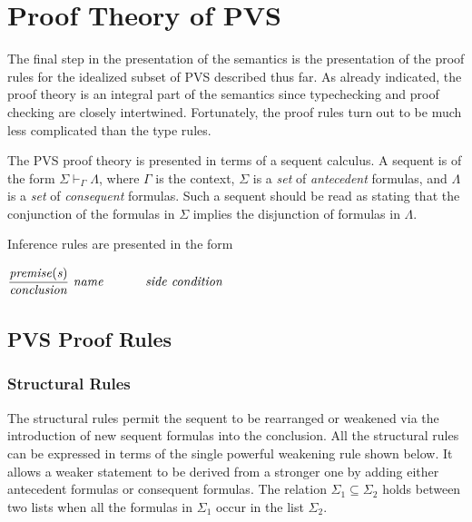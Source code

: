 \documentclass [12pt,twoside]{cslreport}
\newcommand{\Infrule}[3]{
{{\displaystyle\strut #1}\over{\displaystyle\strut #2}}\qquad\makebox[0pt][l]{\it #3}
}
\begin{document}
\chapter{Proof Theory of PVS}\label{proof theory}

The final step in the presentation of the semantics is the presentation of
the proof rules for the idealized subset of PVS described thus far.
As already indicated, the proof theory is an integral part of the
semantics since typechecking and proof checking are closely intertwined.
Fortunately, the proof rules turn out to be much less complicated than the
type rules.

\newcommand{\sequent}[3]{#1\vdash_{#2}#3}

The PVS proof theory is presented in terms of  a sequent calculus.  A
sequent is of the form 
$\sequent{\Sigma}{\Gamma}{\Lambda}$, where $\Gamma$ is the context,
$\Sigma$ is a {\em set\/} of {\em antecedent\/} formulas, and $\Lambda$ 
is a {\em set\/} of {\em consequent\/} formulas.  Such a sequent should
be read as stating that the conjunction of the formulas in $\Sigma$ implies the
disjunction of formulas in $\Lambda$\@.

\renewcommand{\Infrule}[3]{
{{\displaystyle\strut #1}\over{\displaystyle\strut #2}}~\makebox[0pt][l]{{$\mathbf{ #3}$}}
}

Inference rules are presented in the form
\begin{center}
$\Infrule{\mathit{premise(s)}}{\mathit{conclusion}}{\mathit{name}}\hspace{2cm}
\mathit{side\ condition}$
\end{center}


\section{PVS Proof Rules} 

\subsection{Structural Rules}

The structural rules permit the sequent to be rearranged or weakened
via the introduction of new sequent formulas into the conclusion.  
All the structural rules can be expressed in terms of the single
powerful weakening rule  shown below.
It allows a weaker statement to
be derived from a stronger one by adding either antecedent formulas or
consequent formulas.  The relation $\Sigma_1\subseteq\Sigma_2$ holds
between two lists when all the formulas in $\Sigma_1$ occur in the list
$\Sigma_2$.  
\end{document}

